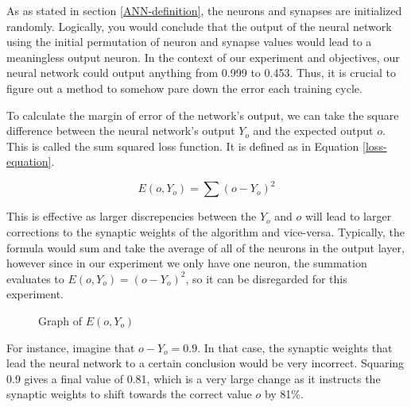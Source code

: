 \documentclass[12pt]{article}
\begin{document}
        As as stated in section \ref{ANN-definition}, the neurons and synapses are initialized randomly. Logically, you would conclude that the output of the neural network using the initial permutation of neuron and synapse values would lead to a meaningless output neuron. In the context of our experiment and objectives, our neural network could output anything from 0.999 to 0.453. Thus, it is crucial to figure out a method to somehow pare down the error each training cycle. 

        To calculate the margin of error of the network's output, we can take the square difference between the neural network's output \(Y_o\) and the expected output \(o\). This is called the sum squared loss function. It is defined as in Equation \ref{loss-equation}. 

        \begin{equation} \label{loss-equation}
            E(o , Y_o) = \sum (o - Y_o)^2
        \end{equation}

        This is effective as larger discrepencies between the $Y_o$ and $o$ will lead to larger corrections to the synaptic weights of the algorithm and vice-versa. Typically, the formula would sum and take the average of all of the neurons in the output layer, however since in our experiment we only have one neuron, the summation evaluates to $E(o , Y_o) = (o - Y_o)^2$, so it can be disregarded for this experiment.

        \begin{figure}[h]
            \centering
            \caption{Graph of $E(o, Y_o)$ \label{errorgraph}}
        \end{figure}

        For instance, imagine that $o - Y_o = 0.9$. In that case, the synaptic weights that lead the neural network to a certain conclusion would be very incorrect. Squaring 0.9 gives a final value of 0.81, which is a very large change as it instructs the synaptic weights to shift towards the correct value $o$ by 81\%.
\end{document}
